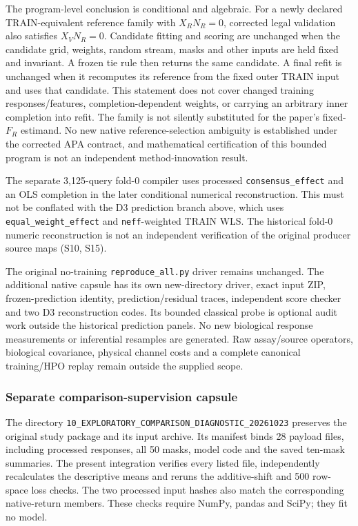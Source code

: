 \documentclass[11pt]{article}
\begin{document}
The program-level conclusion is conditional and algebraic. For a newly declared TRAIN-equivalent reference family with $X_RN_R=0$, corrected legal validation also satisfies $X_VN_R=0$. Candidate fitting and scoring are unchanged when the candidate grid, weights, random stream, masks and other inputs are held fixed and invariant. A frozen tie rule then returns the same candidate. A final refit is unchanged when it recomputes its reference from the fixed outer TRAIN input and uses that candidate. This statement does not cover changed training responses/features, completion-dependent weights, or carrying an arbitrary inner completion into refit. The family is not silently substituted for the paper's fixed-$F_R$ estimand. No new native reference-selection ambiguity is established under the corrected APA contract, and mathematical certification of this bounded program is not an independent method-innovation result.

The separate 3,125-query fold-0 compiler uses processed \texttt{consensus\_effect} and an OLS completion in the later conditional numerical reconstruction. This must not be conflated with the D3 prediction branch above, which uses \texttt{equal\_weight\_effect} and \texttt{neff}-weighted TRAIN WLS. The historical fold-0 numeric reconstruction is not an independent verification of the original producer source maps (S10, S15).

The original no-training \texttt{reproduce\_all.py} driver remains unchanged. The additional native capsule has its own new-directory driver, exact input ZIP, frozen-prediction identity, prediction/residual traces, independent score checker and two D3 reconstruction codes. Its bounded classical probe is optional audit work outside the historical prediction panels. No new biological response measurements or inferential resamples are generated. Raw assay/source operators, biological covariance, physical channel costs and a complete canonical training/HPO replay remain outside the supplied scope.



\subsubsection{Separate comparison-supervision capsule}
The directory \texttt{10\_EXPLORATORY\_COMPARISON\_DIAGNOSTIC\_20261023} preserves the original study package and its input archive. Its manifest binds 28 payload files, including processed responses, all 50 masks, model code and the saved ten-mask summaries. The present integration verifies every listed file, independently recalculates the descriptive means and reruns the additive-shift and 500 row-space loss checks. The two processed input hashes also match the corresponding native-return members. These checks require NumPy, pandas and SciPy; they fit no model.
\end{document}
